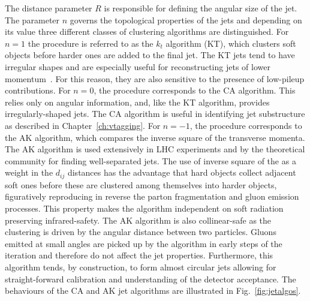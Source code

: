 The distance parameter $R$ is responsible for defining the angular size of the jet. The parameter $n$ governs the topological properties of the jets and depending on its value three different classes of clustering algorithms are distinguished. For $n = 1$ the procedure is referred to as the $k_t$ algorithm (KT), which clusters soft objects before harder ones are added to the final jet. The KT jets tend to have irregular shapes and are especially useful for reconstructing jets of lower momentum~\cite{Cacciari:2008gp}. For this reason, they are also sensitive to the presence of low-\pt pileup contributions.
For $n = 0$, the procedure corresponds to the CA algorithm. This relies only on angular information, and, like the KT algorithm, provides irregularly-shaped jets. The CA algorithm is useful in identifying jet substructure as described in Chapter~\ref{ch:vtagging}. For $n = -1$, the procedure corresponds to the AK algorithm, which compares the inverse square of the transverse momenta.
The AK algorithm is used extensively in LHC experiments and by the theoretical community for finding well-separated jets. The use of inverse square of the \pt as a weight in the $d_{ij}$ distances has the advantage that hard objects collect adjacent soft ones before these are clustered among themselves into harder objects, figuratively reproducing in reverse the parton fragmentation and gluon emission processes.
This property makes the algorithm independent on soft radiation preserving infrared-safety. The AK algorithm is also collinear-safe as the clustering is driven by the angular distance between two particles. Gluons emitted at small angles are picked up by the algorithm in early steps of the iteration and therefore do not affect the jet properties. Furthermore, this algorithm tends, by construction, to form almost circular jets allowing for straight-forward calibration and understanding of the detector acceptance. The behaviours of the CA and AK jet algorithms are illustrated in Fig.~\ref{fig:jetalgos}. 
